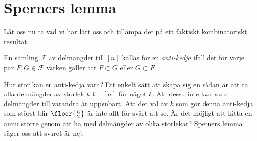 \documentclass[nobib]{tufte-handout}
\begin{document}
\section{Sperners lemma}

Låt oss nu ta vad vi har lärt oss och tillämpa det på ett faktiskt kombinatoriskt resultat.

\begin{definition}
    En samling $\mathcal{F}$ av delmängder till $[n]$ kallas för en \emph{anti-kedja} ifall det för varje par $F, G \in \mathcal{F}$ varken gäller att $F \subset G$ eller $G \subset F$.
\end{definition}

Hur stor kan en anti-kedja vara? Ett enkelt sätt att skapa sig en sådan är att ta alla delmängder av storlek $k$ till $[n]$ för något $k$. Att dessa inte kan vara delmängder till varandra är uppenbart. Att det val av $k$ som gör denna anti-kedja som störst blir $\floor{\frac{n}{2}}$ är inte allt för svårt att se. Är det möjligt att hitta en ännu större genom att ha med delmängder av olika storlekar? Sperners lemma säger oss att svaret är nej.
\end{document}
